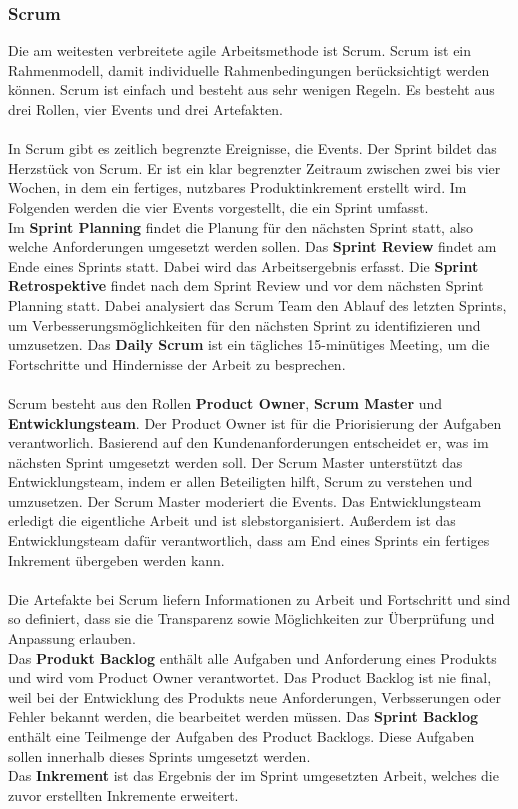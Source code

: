 \documentclass[ngerman]{seminarvorlage}
\begin{document}
\subsubsection{Scrum}
Die am weitesten verbreitete agile Arbeitsmethode ist Scrum. Scrum ist ein Rahmenmodell, damit individuelle Rahmenbedingungen berücksichtigt werden können. Scrum ist einfach und besteht aus sehr wenigen Regeln. Es besteht aus drei Rollen, vier Events und drei Artefakten.\cite{Gaida.2021, Simschek.2022}\\\\
In Scrum gibt es zeitlich begrenzte Ereignisse, die Events. Der Sprint bildet das Herzstück von Scrum. Er ist ein klar begrenzter Zeitraum zwischen zwei bis vier Wochen, in dem ein fertiges, nutzbares Produktinkrement erstellt wird. Im Folgenden werden die vier Events vorgestellt, die ein Sprint umfasst.\\ Im \textbf{Sprint Planning} findet die Planung für den nächsten Sprint statt, also welche Anforderungen umgesetzt werden sollen. Das \textbf{Sprint Review} findet am Ende eines Sprints statt. Dabei wird das Arbeitsergebnis erfasst. Die \textbf{Sprint Retrospektive} findet nach dem Sprint Review und vor dem nächsten Sprint Planning statt. Dabei analysiert das Scrum Team den Ablauf des letzten Sprints, um Verbesserungsmöglichkeiten für den nächsten Sprint zu identifizieren und umzusetzen. Das \textbf{Daily Scrum} ist ein tägliches 15-minütiges Meeting, um die Fortschritte und Hindernisse der Arbeit zu besprechen.\\\\
Scrum besteht aus den Rollen \textbf{Product Owner}, \textbf{Scrum Master} und \textbf{Entwicklungsteam}. Der Product Owner ist für die Priorisierung der Aufgaben verantworlich. Basierend auf den Kundenanforderungen entscheidet er, was im nächsten Sprint umgesetzt werden soll. Der Scrum Master unterstützt das Entwicklungsteam, indem er allen Beteiligten hilft, Scrum zu verstehen und umzusetzen. Der Scrum Master moderiert die Events. Das Entwicklungsteam erledigt die eigentliche Arbeit und ist slebstorganisiert. Außerdem ist das Entwicklungsteam dafür verantwortlich, dass am End eines Sprints ein fertiges Inkrement übergeben werden kann.\cite{Mucke.2024}\\\\
Die Artefakte bei Scrum liefern Informationen zu Arbeit und Fortschritt und sind so definiert, dass sie die Transparenz sowie Möglichkeiten zur Überprüfung und Anpassung erlauben.\\ Das \textbf{Produkt Backlog} enthält alle Aufgaben und Anforderung eines Produkts und wird vom Product Owner verantwortet. Das Product Backlog ist nie final, weil bei der Entwicklung des Produkts neue Anforderungen, Verbsserungen oder Fehler bekannt werden, die bearbeitet werden müssen. Das \textbf{Sprint Backlog} enthält eine Teilmenge der Aufgaben des Product Backlogs. Diese Aufgaben sollen innerhalb dieses Sprints umgesetzt werden.\\ Das \textbf{Inkrement} ist das Ergebnis der im Sprint umgesetzten Arbeit, welches die zuvor erstellten Inkremente erweitert.\\\\
\end{document}
